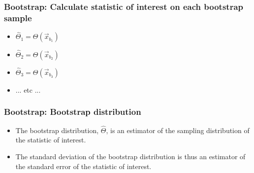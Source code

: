 \documentclass{beamer}
\begin{document}
\begin{frame}
\frametitle{Bootstrap: Calculate statistic of interest on each bootstrap sample}

\begin{itemize}
\item $\widehat{\Theta}_1 = \Theta(\vec{x}_{b_1})$
\item $\widehat{\Theta}_2 = \Theta(\vec{x}_{b_2})$
\item $\widehat{\Theta}_3 = \Theta(\vec{x}_{b_3})$
\item ... etc ...
\end{itemize}

\end{frame}


\begin{frame}
\frametitle{Bootstrap: Bootstrap distribution}

\begin{itemize}
\item The bootstrap distribution, $\widehat{\Theta}$, is an estimator of the sampling distribution of the statistic of interest. 

\item The standard deviation of the bootstrap distribution is thus an estimator of the standard error of the statistic of interest.
\end{itemize}

\end{frame}
\end{document}
